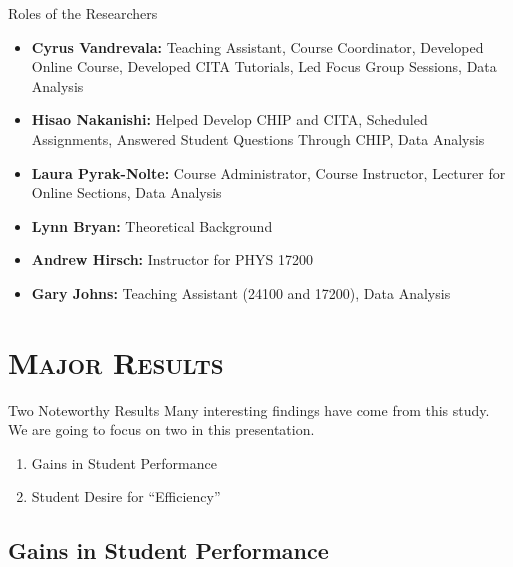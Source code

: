 \documentclass[xcolor=x11names,compress]{beamer}
\begin{document}
\begin{frame}{Roles of the Researchers}
	\begin{itemize}
		\item \textbf{Cyrus Vandrevala:} Teaching Assistant, Course Coordinator, Developed Online Course, Developed CITA Tutorials, Led Focus Group Sessions, Data Analysis
		\vspace{2mm}
		\item \textbf{Hisao Nakanishi:} Helped Develop CHIP and CITA, Scheduled Assignments, Answered Student Questions Through CHIP, Data Analysis
		\vspace{2mm}
		\item \textbf{Laura Pyrak-Nolte:} Course Administrator, Course Instructor, Lecturer for Online Sections, Data Analysis
		\vspace{2mm}
		\item \textbf{Lynn Bryan:} Theoretical Background
		\vspace{2mm}
		\item \textbf{Andrew Hirsch:} Instructor for PHYS 17200
		\vspace{2mm}
		\item \textbf{Gary Johns:} Teaching Assistant (24100 and 17200), Data Analysis
	\end{itemize}
\end{frame}


\section{\scshape Major Results}

\begin{frame}{Two Noteworthy Results}
	Many interesting findings have come from this study. We are going to focus on two in this presentation.
	\vspace{3mm}
	\begin{enumerate}
		\item Gains in Student Performance
		\vspace{1mm}
		\item Student Desire for ``Efficiency''
	\end{enumerate}
\end{frame}

\subsection{Gains in Student Performance}
\end{document}
